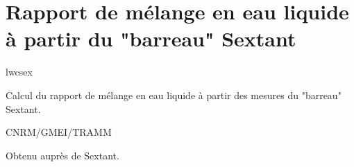%
\section{Rapport de m\'elange en eau liquide \`a partir
du "barreau" Sextant}

 {\sf lwcsex}

Calcul du rapport de m\'elange en eau liquide \`a partir
des mesures du "barreau" Sextant.

\bigskip





CNRM/GMEI/TRAMM

Obtenu aupr\`es de Sextant.
